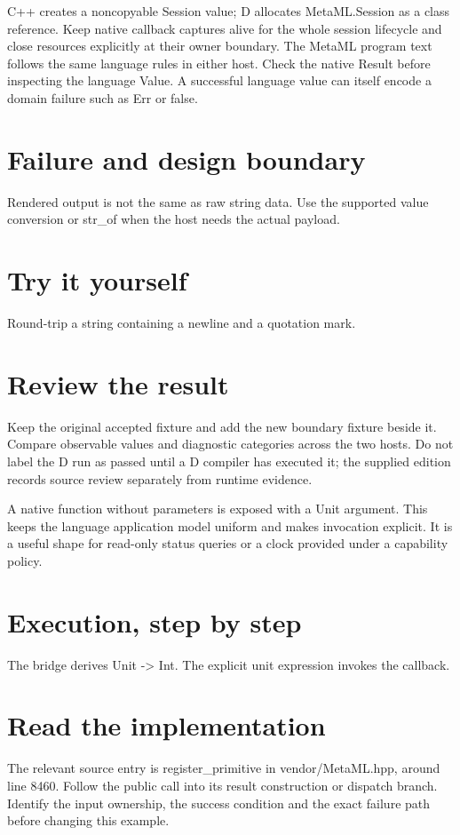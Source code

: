 \clearpage
{}
C++ creates a noncopyable Session value; D allocates MetaML.Session as a class reference. Keep native callback captures alive for the whole session lifecycle and close resources explicitly at their owner boundary. The MetaML program text follows the same language rules in either host. Check the native Result before inspecting the language Value. A successful language value can itself encode a domain failure such as Err or false.


\section*{Failure and design boundary}
Rendered output is not the same as raw string data. Use the supported value conversion or str\_of when the host needs the actual payload.

\section*{Try it yourself}
Round-trip a string containing a newline and a quotation mark.

\section*{Review the result}
Keep the original accepted fixture and add the new boundary fixture beside it. Compare observable values and diagnostic categories across the two hosts. Do not label the D run as passed until a D compiler has executed it; the supplied edition records source review separately from runtime evidence.

\clearpage
{}
A native function without parameters is exposed with a Unit argument. This keeps the language application model uniform and makes invocation explicit. It is a useful shape for read-only status queries or a clock provided under a capability policy.


\section*{Execution, step by step}
The bridge derives Unit -> Int. The explicit unit expression invokes the callback.

\section*{Read the implementation}
The relevant source entry is register\_primitive in vendor/MetaML.hpp, around line 8460. Follow the public call into its result construction or dispatch branch. Identify the input ownership, the success condition and the exact failure path before changing this example.

